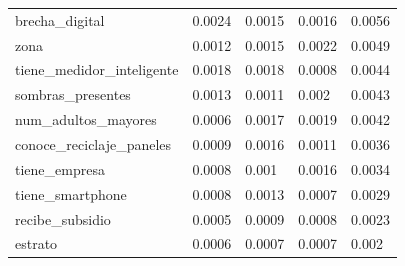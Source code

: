 {\begin{longtable}{@{}p{}llll@{}}
brecha\_digital & 0.0024 & 0.0015 & 0.0016 & 0.0056 \\
zona & 0.0012 & 0.0015 & 0.0022 & 0.0049 \\
tiene\_medidor\_inteligente & 0.0018 & 0.0018 & 0.0008 & 0.0044 \\
sombras\_presentes & 0.0013 & 0.0011 & 0.002 & 0.0043 \\
num\_adultos\_mayores & 0.0006 & 0.0017 & 0.0019 & 0.0042 \\
conoce\_reciclaje\_paneles & 0.0009 & 0.0016 & 0.0011 & 0.0036 \\
tiene\_empresa & 0.0008 & 0.001 & 0.0016 & 0.0034 \\
tiene\_smartphone & 0.0008 & 0.0013 & 0.0007 & 0.0029 \\
recibe\_subsidio & 0.0005 & 0.0009 & 0.0008 & 0.0023 \\
estrato & 0.0006 & 0.0007 & 0.0007 & 0.002 \\
\bottomrule
\end{longtable}}
